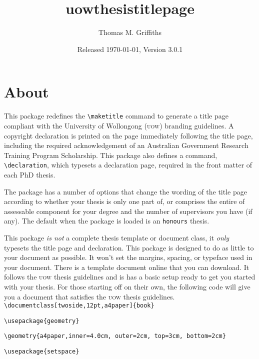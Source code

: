 \documentclass[12pt,oneside]{article}
\newcommand{\option}[1]{\texttt{\color{UOWblue}#1}}
\newcommand{\command}[1]{\texttt{\color{UOWred}#1}}
\newcommand{\comoptions}[1]{\texttt{\color{UOWdarkblue}#1}}
\begin{document}
    
\title{\textsf{uowthesistitlepage}}
\author{\small Thomas M. Griffiths}
\date{Released \today, Version 3.0.1}

\maketitle

\tableofcontents

\section{About}
This package redefines the \command{\textbackslash{}maketitle} command to generate a title page compliant with the University of Wollongong (\textsc{uow}) branding guidelines. A copyright declaration is printed on the page immediately following the title page, including the required acknowledgement of an Australian Government Research Training Program Scholarship. This package also defines a command, \command{\textbackslash{}declaration}, which typesets a declaration page, required in the front matter of each PhD thesis. 

The package has a number of options that change the wording of the title page according to whether your thesis is only one part of, or comprises the entire of assessable component for your degree and the number of supervisors you have (if any). The default when the package is loaded is an \option{honours} thesis.

This package \emph{is not} a complete thesis template or document class, it \emph{only} typesets the title page and declaration. This package is designed to do as little to your document as possible. It won't set the margins, spacing, or typeface used in your document. There is a template document online that you can download. It follows the \textsc{uow} thesis guidelines and is has a basic setup ready to get you started with your thesis. For those starting off on their own, the following code will give you a document that satisfies the \textsc{uow} thesis guidelines.\\

\command{\textbackslash{}documentclass}\option{[twoside,12pt,a4paper]}\comoptions{\{book\}}

\command{\textbackslash{}usepackage}\comoptions{\{geometry\}}

\command{\textbackslash{}geometry}\comoptions{\{a4paper,inner=4.0cm, outer=2cm, top=3cm, bottom=2cm\}}

\command{\textbackslash{}usepackage}\comoptions{\{setspace\}}
\end{document}
